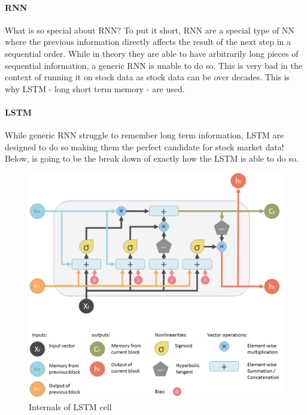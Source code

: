 \documentclass[12pt]{article}
\begin{document}
\paragraph{RNN}
What is so special about RNN? To put it short, RNN are a special type of NN where the previous information directly affects the result of the next step in a sequential order. While in theory they are able to have arbitrarily long pieces of sequential information, a generic RNN is unable to do so. This is very bad in the context of running it on stock data as stock data can be over decades. This is why LSTM - long short term memory - are used.

\paragraph{LSTM}
While generic RNN struggle to remember long term information, LSTM are designed to do so making them the perfect candidate for stock market data! Below, is going to be the break down of exactly how the LSTM is able to do so.

\begin{figure}[H]
  \includegraphics[width=\linewidth]{images/LSTM.png}
  \caption{Internals of LSTM cell}
\end{figure}
\end{document}
